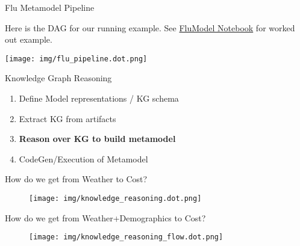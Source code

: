 \documentclass[ignorenonframetext,]{beamer}
\providecommand{\tightlist}{%
  \setlength{\itemsep}{0pt}\setlength{\parskip}{0pt}}
\begin{document}
\begin{frame}{Flu Metamodel Pipeline}
\protect\hypertarget{flu-metamodel-pipeline}{}

Here is the DAG for our running example.
See \href{}{FluModel Notebook} for worked out example.
\begin{center}
\texttt{[image: img/flu\_pipeline.dot.png]}
\end{center}


\end{frame}

\begin{frame}{Knowledge Graph Reasoning}
\protect\hypertarget{knowledge-graph-reasoning}{}

\begin{enumerate}
\tightlist
\item
  Define Model representations / KG schema
\item
  Extract KG from artifacts
\item
  \textbf{Reason over KG to build metamodel}
\item
  CodeGen/Execution of Metamodel
\end{enumerate}

\end{frame}

\begin{frame}{How do we get from Weather to Cost?}
\protect\hypertarget{how-do-we-get-from-weather-to-cost}{}

\begin{figure}
\centering
\texttt{[image: img/knowledge\_reasoning.dot.png]}
\end{figure}

\end{frame}

\begin{frame}{How do we get from Weather+Demographics to Cost?}
\protect\hypertarget{how-do-we-get-from-weatherdemographics-to-cost}{}

\begin{figure}
\centering
\texttt{[image: img/knowledge\_reasoning\_flow.dot.png]}
\end{figure}

\end{frame}
\end{document}
